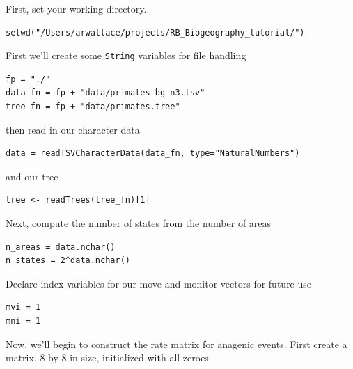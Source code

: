 First, set your working directory.

\begin{snugshade}
\begin{lstlisting}
setwd("/Users/arwallace/projects/RB_Biogeography_tutorial/")
\end{lstlisting}
\end{snugshade}

First we'll create some {\tt String} variables for file handling

\begin{snugshade}
\begin{lstlisting}
fp = "./"
data_fn = fp + "data/primates_bg_n3.tsv"
tree_fn = fp + "data/primates.tree"
\end{lstlisting}
\end{snugshade}

then read in our character data

\begin{snugshade}
\begin{lstlisting}
data = readTSVCharacterData(data_fn, type="NaturalNumbers")
\end{lstlisting}
\end{snugshade}

and our tree

\begin{snugshade}
\begin{lstlisting}
tree <- readTrees(tree_fn)[1]
\end{lstlisting}
\end{snugshade}

Next, compute the number of states from the number of areas

\begin{snugshade}
\begin{lstlisting}
n_areas = data.nchar()
n_states = 2^data.nchar()
\end{lstlisting}
\end{snugshade}

Declare index variables for our move and monitor vectors for future use

\begin{snugshade}
\begin{lstlisting}
mvi = 1
mni = 1
\end{lstlisting}
\end{snugshade}

Now, we'll begin to construct the rate matrix for anagenic events. First create a matrix, 8-by-8 in size, initialized with all zeroes

